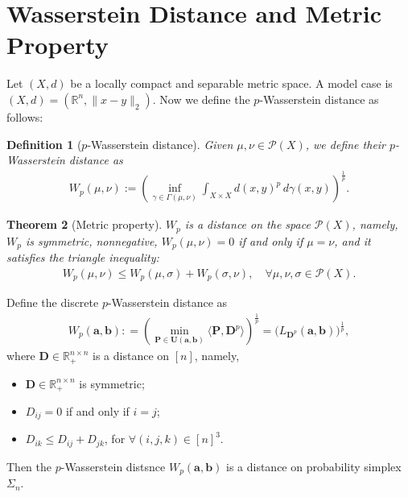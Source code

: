 \documentclass[11pt]{book}
\newtheorem{theorem}{Theorem}[section]
\newtheorem{definition}[theorem]{Definition}
\begin{document}
\section[Wasserstein Distance]{Wasserstein Distance and Metric Property}


Let $(X,d)$ be a locally compact and separable metric space. A model case is $(X,d) = (\mathbb{R}^n, \|x-y\|_2)$. Now we define the $p$-Wasserstein distance as follows:
\begin{definition}[$p$-Wasserstein distance]
Given \(\mu, \nu \in \mathcal{P}(X)\), we define their \(p\)-Wasserstein distance as
\begin{align}
W_p(\mu, \nu) := \left( \inf_{\gamma \in \Gamma(\mu, \nu)} \int_{X \times X} d(x, y)^p \, d\gamma(x, y) \right)^{\frac{1}{p}}.
\end{align}
\end{definition}

\begin{theorem}[Metric property]
$W_p$ is a distance on the space $\mathcal{P}(X)$, namely, $W_p$ is symmetric, nonnegative, $W_p(\mu,\nu) = 0$ if and only if $\mu = \nu$, and it satisfies the triangle inequality:
\begin{align*}
W_p(\mu,\nu) \le W_p(\mu,\sigma) + W_p(\sigma,\nu), \quad \forall \mu,\nu,\sigma \in \mathcal{P}(X).
\end{align*}
\end{theorem}

Define the discrete $p$-Wasserstein distance as
\begin{align}
W_p(\mathbf{a},\mathbf{b}) : = \left(\min_{\mathbf{P}\in \mathbf{U}(\mathbf{a}, \mathbf{b})}  \langle \mathbf{P}, \mathbf{D}^p \rangle \right)^{\frac{1}{p}} = \Big( L_{\mathbf{D}^p}(\mathbf{a},\mathbf{b}) \Big)^{\frac{1}{p}},
\end{align}
where $\mathbf{D} \in \mathbb{R}_+^{n\times n}$ is a distance on $[n]$, namely,
\begin{itemize}
    \item[(i)] \(\mathbf{D} \in \mathbb{R}^{n \times n}_+\) is symmetric;
    \item[(ii)] \(D_{ij} = 0\) if and only if \(i = j\);
    \item[(iii)] \(D_{ik} \leq D_{ij} + D_{jk}\), for $\forall (i, j, k) \in [n]^3$.
\end{itemize}
Then the $p$-Wasserstein distsnce $W_p(\mathbf{a},\mathbf{b})$ is a distance on probability simplex $\Sigma_n$.
\end{document}
